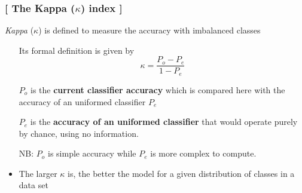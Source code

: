 \documentclass[xcolor=x11names,compress, aspectratio=169]{beamer}
\renewcommand{\(}{\begin{columns}}
\renewcommand{\)}{\end{columns}}
\newcommand{\<}[1]{\begin{column}{#1}}
\renewcommand{\>}{\end{column}}
\begin{document}
\begin{frame} %
\frametitle{\textcolor{brique}{[ The Kappa ($\kappa$) index ]}}
\emph{Kappa} ($\kappa$) is defined to measure the accuracy with imbalanced classes
\begin{itemize}[<+->]
  \item[] Its formal definition is given by
  $$ \kappa = \frac{P_o - P_e}{1 - P_e}  $$
  \item[]$P_o$ is the \textbf{current classifier accuracy} which is compared here with the accuracy of an uniformed classifier $P_e$
  \item[] $P_e$ is the \textbf{accuracy of an uniformed classifier} that would operate purely by chance, using no information.
  \item[NB:] $P_o$ is simple accuracy while $P_e$  is more complex to compute.
  \item  The larger $\kappa $ is, the better the model for a given distribution of classes in a data set
  \end{itemize}
\end{frame}



\end{document}
